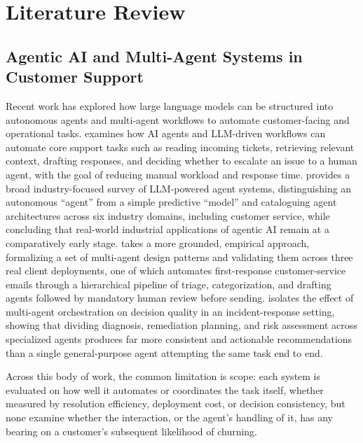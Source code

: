 \documentclass[conference]{IEEEtran}
\begin{document}
\section{Literature Review}

\subsection{Agentic AI and Multi-Agent Systems in Customer Support}
Recent work has explored how large language models can be structured into autonomous agents and multi-agent workflows to automate customer-facing and operational tasks. \cite{b1} examines how AI agents and LLM-driven workflows can automate core support tasks such as reading incoming tickets, retrieving relevant context, drafting responses, and deciding whether to escalate an issue to a human agent, with the goal of reducing manual workload and response time. \cite{b2} provides a broad industry-focused survey of LLM-powered agent systems, distinguishing an autonomous ``agent'' from a simple predictive ``model'' and cataloguing agent architectures across six industry domains, including customer service, while concluding that real-world industrial applications of agentic AI remain at a comparatively early stage. \cite{b3} takes a more grounded, empirical approach, formalizing a set of multi-agent design patterns and validating them across three real client deployments, one of which automates first-response customer-service emails through a hierarchical pipeline of triage, categorization, and drafting agents followed by mandatory human review before sending. \cite{b4} isolates the effect of multi-agent orchestration on decision quality in an incident-response setting, showing that dividing diagnosis, remediation planning, and risk assessment across specialized agents produces far more consistent and actionable recommendations than a single general-purpose agent attempting the same task end to end.

Across this body of work, the common limitation is scope: each system is evaluated on how well it automates or coordinates the task itself, whether measured by resolution efficiency, deployment cost, or decision consistency, but none examine whether the interaction, or the agent's handling of it, has any bearing on a customer's subsequent likelihood of churning.
\end{document}
